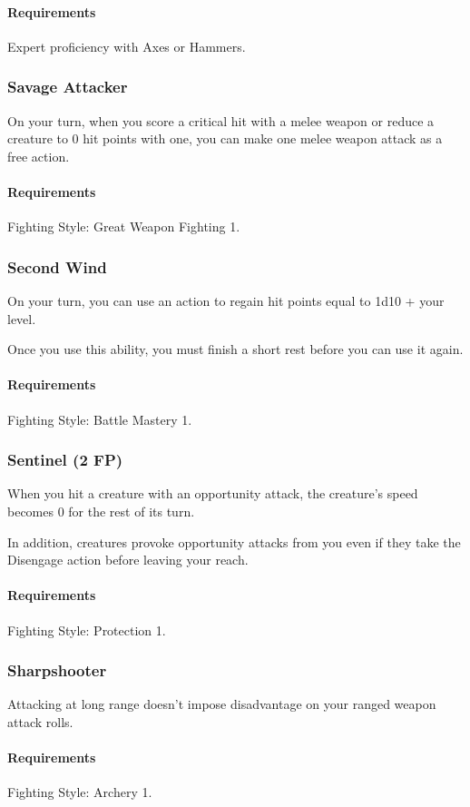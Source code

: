     \paragraph{Requirements} Expert proficiency with Axes or Hammers.
\subsubsection{Savage Attacker} \label{feat::savageattacker}
    On your turn, when you score a critical hit with a melee weapon or reduce a creature to 0 hit points with one, you can make one melee weapon attack as a free action.
    \paragraph{Requirements} Fighting Style: Great Weapon Fighting 1.
\subsubsection{Second Wind} \label{feat::secondwind}
    On your turn, you can use an action to regain hit points equal to 1d10 + your level.

    Once you use this ability, you must finish a short rest before you can use it again.
    \paragraph{Requirements} Fighting Style: Battle Mastery 1.
\subsubsection{Sentinel (2 FP)} \label{feat::sentinel}
    When you hit a creature with an opportunity attack, the creature's speed becomes 0 for the rest of its turn.

    In addition, creatures provoke opportunity attacks from you even if they take the Disengage action before leaving your reach.
    \paragraph{Requirements} Fighting Style: Protection 1.
\subsubsection{Sharpshooter} \label{feat::sharpshooter}
    Attacking at long range doesn't impose disadvantage on your ranged weapon attack rolls.
    \paragraph{Requirements} Fighting Style: Archery 1.
